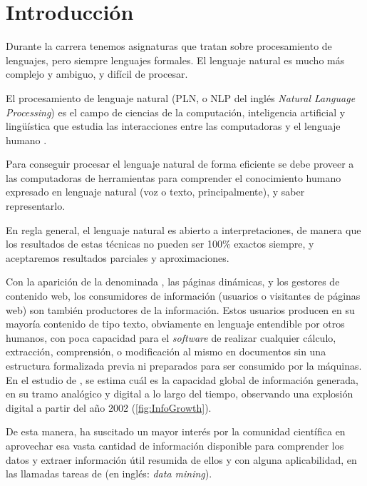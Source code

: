 
\chapter{Introducción}

Durante la carrera tenemos asignaturas que tratan sobre procesamiento de lenguajes, pero siempre lenguajes formales. El lenguaje natural es mucho más complejo y ambiguo, y difícil de procesar.


\begin{definition}[NLP]
El procesamiento de lenguaje natural (PLN, o NLP del inglés \emph{Natural Language Processing}) es el campo de ciencias de la computación, inteligencia artificial y lingüística que estudia las interacciones entre las computadoras y el lenguaje humano \citep[Procesamiento de lenguajes naturales]{wikipedia-es}.
\end{definition}

Para conseguir procesar el lenguaje natural de forma eficiente se debe proveer a las computadoras de herramientas para comprender el conocimiento humano expresado en lenguaje natural (voz o texto, principalmente), y saber representarlo.

En regla general, el lenguaje natural es abierto a interpretaciones, de manera que los resultados de estas técnicas no pueden ser 100\% exactos siempre, y aceptaremos resultados parciales y aproximaciones.

Con la aparición de la denominada , las páginas dinámicas, y los gestores de contenido web, los consumidores de información (usuarios o visitantes de páginas web) son también productores de la información. Estos usuarios producen en su mayoría contenido de tipo texto, obviamente en lenguaje entendible por otros humanos, con poca capacidad para el \emph{software} de realizar cualquier cálculo, extracción, comprensión, o modificación al mismo en documentos sin una estructura formalizada previa ni preparados para ser consumido por la máquinas. En el estudio de \citet{Hilbert2011}, se estima cuál es la capacidad global de información generada, en su tramo analógico y digital a lo largo del tiempo, observando una explosión digital a partir del año 2002 (\autoref{fig:InfoGrowth}).

De esta manera, ha suscitado un mayor interés por la comunidad científica en aprovechar esa vasta cantidad de información disponible para comprender los datos y extraer información útil resumida de ellos y con alguna aplicabilidad, en las llamadas tareas de  (en inglés: \emph{data mining}).

